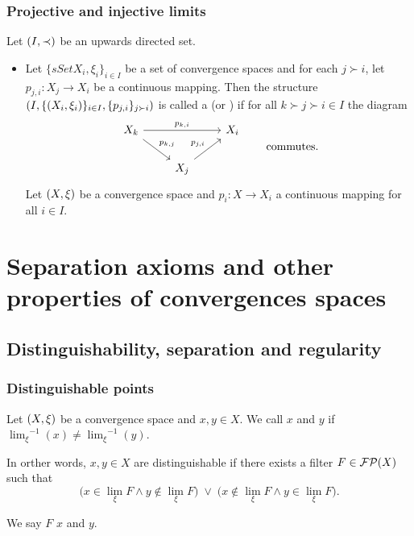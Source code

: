 \subsection{Projective and injective limits}
\begin{definition}
Let $\left( I, \prec \right)$ be an upwards directed set.
\begin{itemize}
\item Let $\{sSet{X_i, \xi_i}\}_{i\in I}$ be a set of convergence spaces and for each $j \succ i$, let $p_{j,i}: X_j \to X_i$ be a continuous mapping. Then the structure $\left( I, \{\left( X_i, \xi_i \right)\}_{i\in I}, \{p_{j,i}\}_{j\succ i} \right)$ is called a  (or ) if for all $k \succ j \succ i \in I$ the diagram
\[ \begin{tikzcd}
X_k \ar[rr, "p_{k,i}"] \ar[rd, "p_{k,j}"] & & X_i \\
& X_j \ar[ur, "p_{j,i}"]
\end{tikzcd} \qquad \text{commutes.} \]
Let $\left( X, \xi \right)$ be a convergence space and $p_i: X\to X_i$ a continuous mapping for all $i\in I$. 
\end{itemize}
\end{definition}

\chapter{Separation axioms and other properties of convergences spaces}

\section{Distinguishability, separation and regularity}
\subsection{Distinguishable points}
\begin{definition}
Let $\left( X,\xi \right)$ be a convergence space and $x,y\in X$. We call $x$ and $y$  if ${\lim_\xi}^{-1}(x) \neq {\lim_\xi}^{-1}(y)$.
\end{definition}

In orther words, $x,y \in X$ are distinguishable if there exists a filter $F \in \operatorname{\mathcal{FP}}(X)$ such that
\[ \Big(x\in \lim_\xi F \land y\notin \lim_\xi F\Big)\;\lor\; \Big(x\notin \lim_\xi F \land y\in \lim_\xi F\Big). \]

We say $F$  $x$ and $y$.

